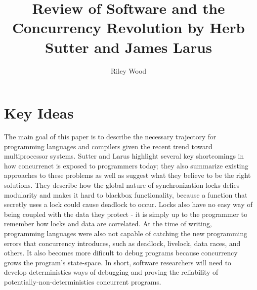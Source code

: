\documentclass{article}
\title{Review of Software and the Concurrency Revolution by Herb Sutter and James Larus}
\author{Riley Wood}
\begin{document}
\maketitle

\section*{Key Ideas}
The main goal of this paper is to describe the necessary trajectory for programming languages and compilers given the recent trend toward multiprocessor systems. Sutter and Larus highlight several key shortcomings in how concurrenct is exposed to programmers today; they also summarize existing approaches to these problems as well as suggest what they believe to be the right solutions. They describe how the global nature of synchronization locks defies modularity and makes it hard to blackbox functionality, because a function that secretly uses a lock could cause deadlock to occur. Locks also have no easy way of being coupled with the data they protect - it is simply up to the programmer to remember how locks and data are correlated. At the time of writing, programming languages were also not capable of catching the new programming errors that concurrency introduces, such as deadlock, livelock, data races, and others. It also becomes more dificult to debug programs because concurrency grows the program's state-space. In short, software researchers will need to develop deterministics ways of debugging and proving the reliability of potentially-non-deterministics concurrent programs.
\end{document}

